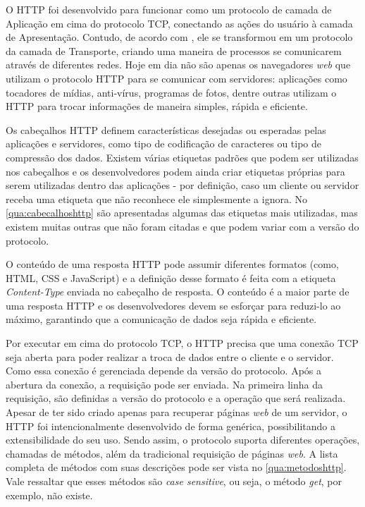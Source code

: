 O HTTP foi desenvolvido para funcionar como um protocolo de camada de Aplicação em cima do protocolo TCP, conectando as ações do usuário à camada de Apresentação. Contudo, de acordo com , ele se transformou em um protocolo da camada de Transporte, criando uma maneira de processos se comunicarem através de diferentes redes. Hoje em dia não são apenas os navegadores \textit{web} que utilizam o protocolo HTTP para se comunicar com servidores: aplicações como tocadores de mídias, anti-vírus, programas de fotos, dentre outras utilizam o HTTP para trocar informações de maneira simples, rápida e eficiente.

Os cabeçalhos HTTP definem características desejadas ou esperadas pelas aplicações e servidores, como tipo de codificação de caracteres ou tipo de compressão dos dados. Existem várias etiquetas padrões que podem ser utilizadas nos cabeçalhos e os desenvolvedores podem ainda criar etiquetas próprias para serem utilizadas dentro das aplicações - por definição, caso um cliente ou servidor receba uma etiqueta que não reconhece ele simplesmente a ignora. No \autoref{qua:cabecalhoshttp} são apresentadas algumas das etiquetas mais utilizadas, mas existem muitas outras que não foram citadas e que podem variar com a versão do protocolo.



O conteúdo de uma resposta HTTP pode assumir diferentes formatos (como, HTML, CSS e JavaScript) e a definição desse formato é feita com a etiqueta \textit{Content-Type} enviada no cabeçalho de resposta. O conteúdo é a maior parte de uma resposta HTTP e os desenvolvedores devem se esforçar para reduzi-lo ao máximo, garantindo que a comunicação de dados seja rápida e eficiente.

Por executar em cima do protocolo TCP, o HTTP precisa que uma conexão TCP seja aberta para poder realizar a troca de dados entre o cliente e o servidor. Como essa conexão é gerenciada depende da versão do protocolo. Após a abertura da conexão, a requisição pode ser enviada. Na primeira linha da requisição, são definidas a versão do protocolo e a operação que será realizada. Apesar de ter sido criado apenas para recuperar páginas \textit{web} de um servidor, o HTTP foi intencionalmente desenvolvido de forma genérica, possibilitando a extensibilidade do seu uso. Sendo assim, o protocolo suporta diferentes operações, chamadas de métodos, além da tradicional requisição de páginas \textit{web}. A lista completa de métodos com suas descrições pode ser vista no \autoref{qua:metodoshttp}. Vale ressaltar que esses métodos são \textit{case sensitive}, ou seja, o método \textit{get}, por exemplo, não existe.

